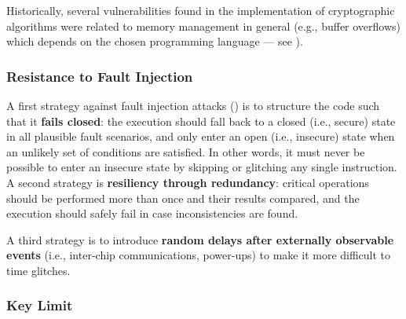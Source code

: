 
Historically, several vulnerabilities found in the implementation of cryptographic algorithms were related to memory management in general (e.g., buffer overflows) which depends on the chosen programming language --- see ).


\subsubsection{Resistance to Fault Injection}\label{sec:security_of_cryptographic_algorithms:best_practices:fault}

A first strategy against fault injection attacks () is to structure the code such that it \textbf{fails closed}: the execution should fall back to a closed (i.e., secure) state in all plausible fault scenarios, and only enter an open (i.e., insecure) state when an unlikely set of conditions are satisfied. In other words, it must never be possible to enter an insecure state by skipping or glitching any single instruction. A second strategy is \textbf{resiliency through redundancy}: critical operations should be performed more than once and their results compared, and the execution should safely fail in case inconsistencies are found. 

	
A third strategy is to introduce \textbf{random delays after externally observable events} (i.e., inter-chip communications, power-ups) to make it more difficult to time glitches.

\subsubsection{Key Limit}\label{sec:security_of_cryptographic_algorithms:best_practices:limit}

